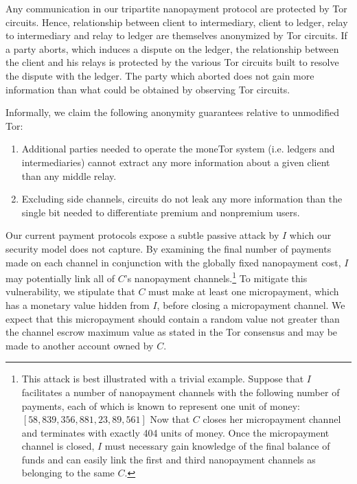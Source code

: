 Any communication in our tripartite nanopayment protocol are protected by Tor
circuits. Hence, relationship between client to intermediary, client to ledger,
relay to intermediary and relay to ledger are themselves anonymized by Tor
circuits. If a party aborts, which induces a dispute on the ledger, the
relationship between the client and his relays is protected by the various Tor
circuits built to resolve the dispute with the ledger. The party which aborted
does not gain more information than what could be obtained by observing Tor
circuits.

Informally, we claim the following anonymity guarantees relative to unmodified
Tor:

\begin{enumerate}
\item Additional parties needed to operate the moneTor system (i.e. ledgers and
  intermediaries) cannot extract any more information about a given client than
  any middle relay.
\item Excluding side channels, circuits do not leak any more information than
  the single bit needed to differentiate premium and nonpremium users.
\end{enumerate}

Our current payment protocols expose a subtle passive attack by $I$ which our
security model does not capture. By examining the final number of payments made
on each channel in conjunction with the globally fixed nanopayment cost, $I$ may
potentially link all of $C$'s nanopayment channels.\footnote{This attack is best
  illustrated with a trivial example. Suppose that $I$ facilitates a number of
  nanopayment channels with the following number of payments, each of which is
  known to represent one unit of money: $[58, 839, 356, 881, 23, 89, 561]$ Now
  that $C$ closes her micropayment channel and terminates with exactly 404 units
  of money. Once the micropayment channel is closed, $I$ must necessary gain
  knowledge of the final balance of funds and can easily link the first and
  third nanopayment channels as belonging to the same $C$.} To mitigate this
vulnerability, we stipulate that $C$ must make at least one micropayment, which
has a monetary value hidden from $I$, before closing a micropayment channel. We
expect that this micropayment should contain a random value not greater than the
channel escrow maximum value as stated in the Tor consensus and may be made to
another account owned by $C$.

